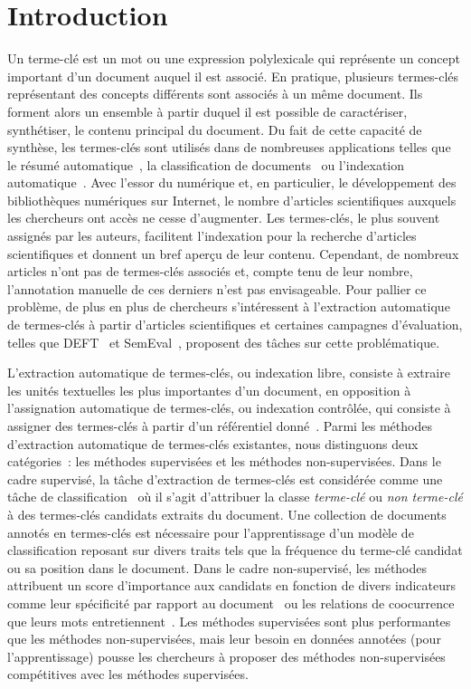 \section{Introduction}
\label{sec:introduction}
  Un terme-clé est un mot ou une expression polylexicale qui représente un
  concept important d'un document auquel il est associé. En pratique, plusieurs
  termes-clés représentant des concepts différents sont associés à un même
  document. Ils forment alors un ensemble à partir duquel il est
  possible de caractériser, synthétiser, le contenu principal du document. Du
  fait de cette capacité de synthèse, les termes-clés sont utilisés dans de
  nombreuses applications telles que le résumé
  automatique~\cite{avanzo2005keyphrase}, la classification de
  documents~\cite{han2007webdocumentclustering} ou l'indexation
  automatique~\cite{medelyan2008smalltrainingset}. Avec l'essor du numérique et,
  en particulier, le développement des bibliothèques numériques sur Internet, le
  nombre d'articles scientifiques auxquels les chercheurs ont accès ne cesse
  d'augmenter. Les termes-clés, le plus souvent assignés par les auteurs,
  facilitent l'indexation pour la recherche d'articles scientifiques et donnent
  un bref aperçu de leur contenu. Cependant, de nombreux articles n'ont pas de
  termes-clés associés et, compte tenu de leur nombre, l'annotation manuelle de
  ces derniers n'est pas envisageable. Pour pallier ce problème, de plus en plus
  de chercheurs s'intéressent à l'extraction automatique de termes-clés à partir
  d'articles scientifiques et certaines campagnes d'évaluation, telles que
  DEFT~\cite{paroubek2012deft} et SemEval~\cite{kim2010semeval}, proposent des
  tâches sur cette problématique.

  L'extraction automatique de termes-clés, ou indexation libre,
  consiste à extraire les unités textuelles les plus importantes d'un document,
  en opposition à l'assignation automatique de termes-clés, ou
  indexation contrôlée, qui consiste à assigner des termes-clés à partir d'un
  référentiel donné~\cite{paroubek2012deft}. Parmi les méthodes d'extraction
  automatique de termes-clés existantes, nous distinguons deux catégories~: les
  méthodes supervisées et les méthodes non-supervisées. Dans le cadre supervisé,
  la tâche d'extraction de termes-clés est considérée comme une tâche de
  classification~\cite{witten1999kea} où il s'agit d'attribuer la classe
  \og{}\textit{terme-clé}\fg{} ou \og{}\textit{non terme-clé}\fg{} à des
  termes-clés candidats extraits du document. Une collection de documents
  annotés en termes-clés est nécessaire pour l'apprentissage d'un modèle de
  classification reposant sur divers traits tels que la fréquence du terme-clé
  candidat ou sa position dans le document. Dans le cadre non-supervisé, les
  méthodes attribuent un score d'importance aux candidats en fonction de divers
  indicateurs comme leur spécificité par rapport au
  document~\cite{paukkeri2010likey} ou les relations de coocurrence que leurs
  mots entretiennent~\cite{mihalcea2004textrank}. Les méthodes supervisées sont
  plus performantes que les méthodes non-supervisées, mais leur besoin en
  données annotées (pour l'apprentissage) pousse les chercheurs à proposer des
  méthodes non-supervisées compétitives avec les méthodes supervisées.

